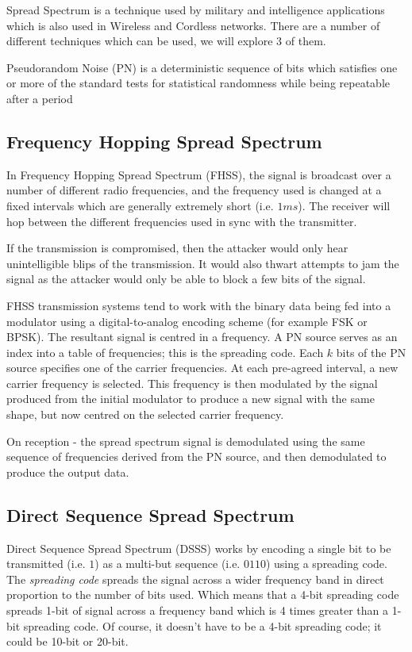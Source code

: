 Spread Spectrum is a technique used by military and intelligence applications which is also used in Wireless and Cordless networks. There are a number of different techniques which can be used, we will explore 3 of them. 

\begin{define}
    \item[Pseudorandom Noise] (PN) is a deterministic sequence of bits which satisfies one or more of the standard tests for statistical randomness while being repeatable after a period
\end{define}

\subsection{Frequency Hopping Spread Spectrum}
In Frequency Hopping Spread Spectrum (FHSS), the signal is broadcast over a number of different radio frequencies, and the frequency used is changed at a fixed intervals which are generally extremely short (i.e. $1 ms$). The receiver will hop between the different frequencies used in sync with the transmitter.

If the transmission is compromised, then the attacker would only hear unintelligible blips of the transmission. It would also thwart attempts to jam the signal as the attacker would only be able to block a few bits of the signal. 

FHSS transmission systems tend to work with the binary data being fed into a modulator using a digital-to-analog encoding scheme (for example FSK or BPSK). The resultant signal is centred in a frequency. A PN source serves as an index into a table of frequencies; this is the spreading code. Each $k$ bits of the PN source specifies one of the carrier frequencies. At each pre-agreed interval, a new carrier frequency is selected. This frequency is then modulated by the signal produced from the initial modulator to produce a new signal with the same shape, but now centred on the selected carrier frequency.

On reception - the spread spectrum signal is demodulated using the same sequence of frequencies derived from the PN source, and then demodulated to produce the output data. 

\subsection{Direct Sequence Spread Spectrum}
Direct Sequence Spread Spectrum (DSSS) works by encoding a single bit to be transmitted (i.e. $1$) as a multi-but sequence (i.e. $0110$) using a spreading code. The \textit{spreading code} spreads the signal across a wider frequency band in direct proportion to the number of bits used. Which means that a 4-bit spreading code spreads 1-bit of signal across a frequency band which is 4 times greater than a 1-bit spreading code. Of course, it doesn't have to be a 4-bit spreading code; it could be 10-bit or 20-bit. 


